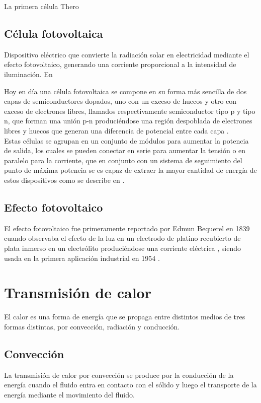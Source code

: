 La primera célula Thero
\subsection{Célula fotovoltaica}
Dispositivo eléctrico que convierte la radiación solar en electricidad mediante el efecto fotovoltaico, generando una corriente proporcional a la intensidad de iluminación. En 

Hoy en día una célula fotovoltaica se compone en su forma más sencilla de dos capas de semiconductores dopados, uno con un exceso de huecos y otro con exceso de electrones libres, llamados respectivamente semiconductor tipo p y tipo n, que forman una unión p-n produciéndose una región despoblada de electrones libres y huecos que generan una diferencia de potencial entre cada capa \cite{PhotovoltaicCell_FullDescription_EstadoDelArte_KHALIGH2018725}.\\

Estas células se agrupan en un conjunto de módulos para aumentar la potencia de salida, los cuales se pueden conectar en serie para aumentar la tensión o en paralelo para la corriente, que en conjunto con un sistema de seguimiento del punto de máxima potencia se es capaz de extraer la mayor cantidad de energía de estos dispositivos como se describe en \cite{PhotovoltaicCell_FullDescription_EstadoDelArte_KHALIGH2018725}.
\subsection{Efecto fotovoltaico}
El efecto fotovoltaico fue primeramente reportado por Edmun Bequerel en 1839 cuando observaba el efecto de la luz en un electrodo de platino recubierto de plata inmerso en un electrólito produciéndose una corriente eléctrica \cite{PhotovoltaicEffect_History_SUDHAKAR2018117}, siendo usada en la primera aplicación industrial en 1954 \cite{PhotovoltaicEffect_History_IndustrialUse_DINCER2018707} .%

\section{Transmisión de calor}
El calor es una forma de energía que se propaga entre distintos medios de tres formas distintas, por convección, radiación y conducción.
\subsection{Convección}
La transmisión de calor por convección se produce por la conducción de la energía cuando el fluido entra en contacto con el sólido y luego el transporte de la energía mediante el movimiento del fluido.
